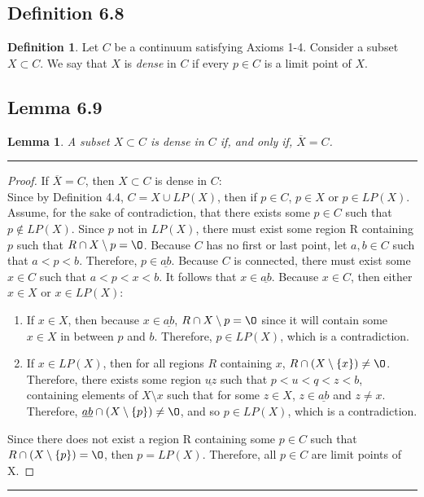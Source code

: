 \documentclass[openany, amssymb, psamsfonts]{amsart}
\renewcommand{\emptyset}{\O}
\newcommand{\sm}{\setminus}
\newtheorem{lem}{Lemma}[section]
\theoremstyle{definition}
\newtheorem{defn}{Definition}[section]
\numberwithin{equation}{section}
\begin{document}
\subsection*{Definition 6.8}
\begin{defn}
\label{6.8}
Let $C$ be a continuum satisfying Axioms 1-4.	Consider a subset $X \subset C.$ We say that $X$ is \emph{dense} in $C$ if every $p \in C$ is a limit point of $X$.
\end{defn}

\subsection*{Lemma 6.9}
\begin{lem}
\label{6.9}
A subset $X \subset C$ is dense in $C$ if, and only if, $\overline{X} = C$. 
\end{lem}
\vspace{4pt}     \hrule   \vspace{4pt} \begin{proof}  If $\overline{X} = C$, then $X \subset C$ is dense in $C$:\\
Since by Definition 4.4, $C = X \cup LP(X)$, then if $p\in C$, $p\in X$ or $p\in LP(X)$. Assume, for the sake of contradiction, that there exists some $p\in C$ such that $p\notin LP(X)$. Since $p$ not in $LP(X)$, there must exist some region R containing $p$ such that $R \cap X \sm {p} = \emptyset$. Because $C$ has no first or last point, let $a,b \in C$ such that $a<p<b$. Therefore, $p\in \underline{ab}$. Because $C$ is connected, there must exist some $x\in C$ such that $a<p<x<b$. It follows that $x\in \underline{ab}$. Because $x\in C$, then either $x\in X$ or $x\in LP(X)$:
\begin{enumerate}
\item If $x\in X$, then because $x\in \underline{ab}$, $R \cap X \sm {p} = \emptyset$ since it will contain some $x\in X$ in between $p$ and $b$. Therefore, $p\in LP(X)$, which is a contradiction.
\item If $x\in LP(X)$, then for all regions $R$ containing $x$, $R\cap (X\sm \{x\}) \neq \emptyset$. Therefore, there exists some region $\underline{uz}$ such that $p<u<q<z<b$, containing elements of $X\sm x$ such that for some $z\in X$, $z\in \underline{ab}$ and $z\neq x$. Therefore, $\underline{ab}\cap (X\sm\{p\}) \neq \emptyset$, and so $p\in LP(X)$, which is a contradiction.
\end{enumerate}
Since there does not exist a region R containing some $p\in C$ such that $R \cap (X\sm \{p\}) = \emptyset$, then $p=LP(X)$. Therefore, all $p\in C$ are limit points of X.
\end{proof} \vspace{4pt}     \hrule   \vspace{4pt}
\end{document}

